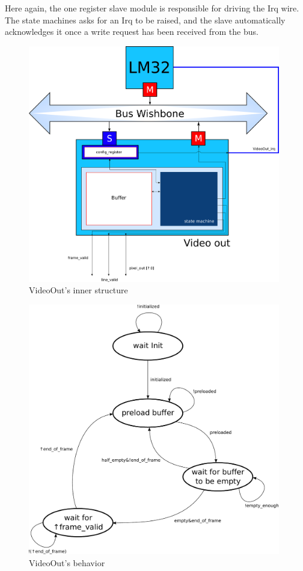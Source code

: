 Here again, the one register slave module is responsible for driving the Irq wire.
The state machines asks for an Irq to be raised, and the slave automatically acknowledges it once a write request has been received from the bus.

\vfill
\begin{figure}[h]
\center
\includegraphics[width=11cm]{figs/Video_Out_blocks.pdf}
\caption{VideoOut's inner structure}
\label{VideoOut_struct}
\end{figure}
\vfill

\begin{figure}[h]
\center
\includegraphics[width=11cm]{figs/video_out_sm.pdf}
\caption{VideoOut's behavior}
\label{VideoOut_behavior}
\end{figure}

